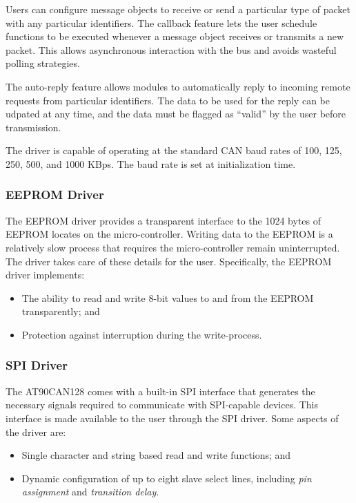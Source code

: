 Users can configure message objects to receive or send a particular type of packet with any particular identifiers. The callback feature lets the user schedule functions to be executed whenever a message object receives or transmits a new packet. This allows asynchronous interaction with the bus and avoids wasteful polling strategies.

The auto-reply feature allows modules to automatically reply to incoming remote requests from particular identifiers. The data to be used for the reply can be udpated at any time, and the data must be flagged as ``valid'' by the user before transmission.

The driver is capable of operating at the standard CAN baud rates of 100, 125, 250, 500, and 1000 KBps. The baud rate is set at initialization time.

\subsubsection{EEPROM Driver}

The EEPROM driver provides a transparent interface to the 1024 bytes of EEPROM locates on the micro-controller. Writing data to the EEPROM is a relatively slow process that requires the micro-controller remain uninterrupted. The driver takes care of these details for the user. Specifically, the EEPROM driver implements:

\begin{itemize}
\item The ability to read and write 8-bit values to and from the EEPROM transparently; and
\item Protection against interruption during the write-process.
\end{itemize}

\subsubsection{SPI Driver}
\label{sec:impl_spi_driver}

The AT90CAN128 comes with a built-in SPI interface that generates the necessary signals required to communicate with SPI-capable devices. This interface is made available to the user through the SPI driver. Some aspects of the driver are:

\begin{itemize}
\item Single character and string based read and write functions; and
\item Dynamic configuration of up to eight slave select lines, including \emph{pin assignment} and \emph{transition delay}.
\end{itemize}

